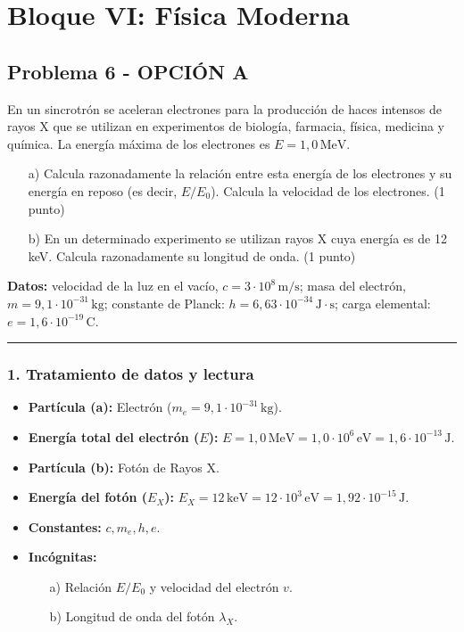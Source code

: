 \newpage
\section{Bloque VI: Física Moderna}
\label{sec:moderna2_2016_jul_ext}
\subsection{Problema 6 - OPCIÓN A}
\label{subsec:6A_2016_jul_ext}
\begin{cajaenunciado}
En un sincrotrón se aceleran electrones para la producción de haces intensos de rayos X que se utilizan en experimentos de biología, farmacia, física, medicina y química. La energía máxima de los electrones es $E=1,0\,\text{MeV}$.
\begin{enumerate}
    \item[a)] Calcula razonadamente la relación entre esta energía de los electrones y su energía en reposo (es decir, $E/E_0$). Calcula la velocidad de los electrones. (1 punto)
    \item[b)] En un determinado experimento se utilizan rayos X cuya energía es de 12 keV. Calcula razonadamente su longitud de onda. (1 punto)
\end{enumerate}
\textbf{Datos:} velocidad de la luz en el vacío, $c=3\cdot10^8\,\text{m/s}$; masa del electrón, $m=9,1\cdot10^{-31}\,\text{kg}$; constante de Planck: $h=6,63\cdot10^{-34}\,\text{J}\cdot\text{s}$; carga elemental: $e=1,6\cdot10^{-19}\,\text{C}$.
\end{cajaenunciado}
\hrule

\subsubsection*{1. Tratamiento de datos y lectura}
\begin{itemize}
    \item \textbf{Partícula (a):} Electrón ($m_e = 9,1\cdot10^{-31}\,\text{kg}$).
    \item \textbf{Energía total del electrón ($E$):} $E = 1,0\,\text{MeV} = 1,0 \cdot 10^6\,\text{eV} = 1,6\cdot10^{-13}\,\text{J}$.
    \item \textbf{Partícula (b):} Fotón de Rayos X.
    \item \textbf{Energía del fotón ($E_X$):} $E_X = 12\,\text{keV} = 12 \cdot 10^3\,\text{eV} = 1,92\cdot10^{-15}\,\text{J}$.
    \item \textbf{Constantes:} $c, m_e, h, e$.
    \item \textbf{Incógnitas:}
        \begin{itemize}
            \item[a)] Relación $E/E_0$ y velocidad del electrón $v$.
            \item[b)] Longitud de onda del fotón $\lambda_X$.
        \end{itemize}
\end{itemize}

